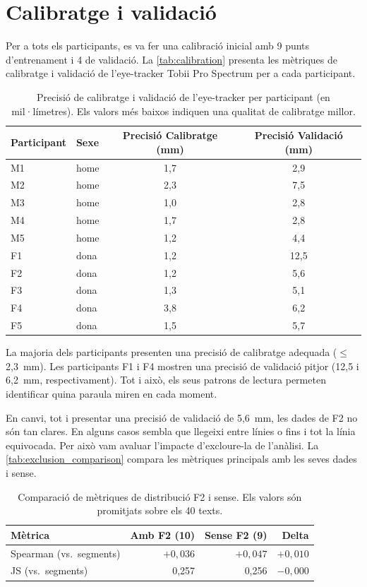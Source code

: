 \chapter{Calibratge i validació}\label{app:calibration}

Per a tots els participants, es va fer una calibració inicial amb 9 punts d'entrenament i 4 de validació.
La \autoref{tab:calibration} presenta les mètriques de calibratge i validació de l'eye-tracker Tobii Pro Spectrum per a cada participant.

\iftables
\begin{table}[htbp]
\small
\centering
\begin{tabular}{llcc}
\toprule
\textbf{Participant} & \textbf{Sexe} & \textbf{Precisió Calibratge (mm)} & \textbf{Precisió Validació (mm)} \\
\midrule
M1 & home & 1,7 & 2,9 \\
M2 & home & 2,3 & 7,5 \\
M3 & home & 1,0 & 2,8 \\
M4 & home & 1,7 & 2,8 \\
M5 & home & 1,2 & 4,4 \\
F1 & dona & 1,2 & 12,5 \\
F2 & dona & 1,2 & 5,6 \\
F3 & dona & 1,3 & 5,1 \\
F4 & dona & 3,8 & 6,2 \\
F5 & dona & 1,5 & 5,7 \\
\bottomrule
\end{tabular}
\caption{Precisió de calibratge i validació de l'eye-tracker per participant (en mil·límetres). Els valors més baixos indiquen una qualitat de calibratge millor.}
\label{tab:calibration}
\end{table}
\fi

La majoria dels participants presenten una precisió de calibratge adequada ($\leq$ 2,3~mm).
Les participants F1 i F4 mostren una precisió de validació pitjor (12,5 i 6,2~mm, respectivament).
Tot i això, els seus patrons de lectura permeten identificar quina paraula miren en cada moment.

En canvi, tot i presentar una precisió de validació de 5,6~mm, les dades de F2 no són tan clares. En alguns casos sembla que llegeixi entre línies o fins i tot la línia equivocada.
Per això vam avaluar l'impacte d'excloure-la de l'anàlisi.
La \autoref{tab:exclusion_comparison} compara les mètriques principals amb les seves dades i sense.

\iftables
\begin{table}[htbp]
\small
\centering
\begin{tabular}{lrrr}
\toprule
\textbf{Mètrica} & \textbf{Amb F2 (10)} & \textbf{Sense F2 (9)} & \textbf{Delta} \\
\midrule
Spearman (vs.\ segments) & $+0,036$ & $+0,047$ & $+0,010$ \\
JS (vs.\ segments) & 0,257 & 0,256 & $-0,000$ \\
\bottomrule
\end{tabular}
\caption{Comparació de mètriques de distribució F2 i sense. Els valors són promitjats sobre els 40 texts.}
\label{tab:exclusion_comparison}
\end{table}
\fi

